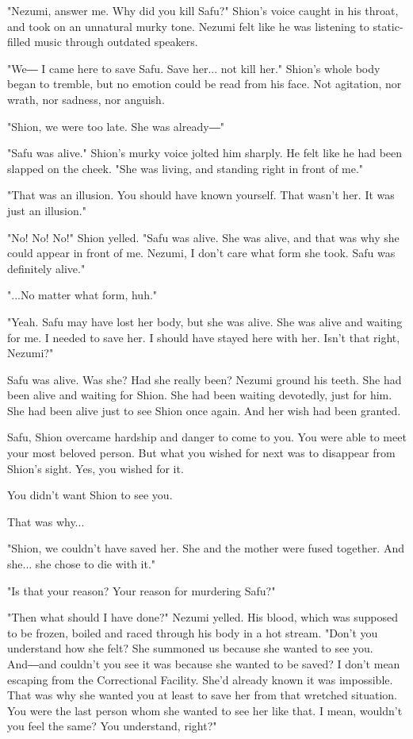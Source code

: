 "Nezumi, answer me. Why did you kill Safu?" Shion's voice caught in his
throat, and took on an unnatural murky tone. Nezumi felt like he was
listening to static-filled music through outdated speakers.

"We― I came here to save Safu. Save her... not kill her." Shion's whole
body began to tremble, but no emotion could be read from his face. Not
agitation, nor wrath, nor sadness, nor anguish.

"Shion, we were too late. She was already―"

"Safu was alive." Shion's murky voice jolted him sharply. He felt like
he had been slapped on the cheek. "She was living, and standing right in
front of me."

"That was an illusion. You should have known yourself. That wasn't her.
It was just an illusion."

"No! No! No!" Shion yelled. "Safu was alive. She was alive, and that was
why she could appear in front of me. Nezumi, I don't care what form she
took. Safu was definitely alive."

"...No matter what form, huh."

"Yeah. Safu may have lost her body, but she was alive. She was alive and
waiting for me. I needed to save her. I should have stayed here with
her. Isn't that right, Nezumi?"

Safu was alive. Was she? Had she really been? Nezumi ground his teeth.
She had been alive and waiting for Shion. She had been waiting
devotedly, just for him. She had been alive just to see Shion once
again. And her wish had been granted.

Safu, Shion overcame hardship and danger to come to you. You were able
to meet your most beloved person. But what you wished for next was to
disappear from Shion's sight. Yes, you wished for it.

You didn't want Shion to see you.

That was why...

"Shion, we couldn't have saved her. She and the mother were fused
together. And she... she chose to die with it."

"Is that your reason? Your reason for murdering Safu?"

"Then what should I have done?" Nezumi yelled. His blood, which was
supposed to be frozen, boiled and raced through his body in a hot
stream. "Don't you understand how she felt? She summoned us because she
wanted to see you. And―and couldn't you see it was because she wanted to
be saved? I don't mean escaping from the Correctional Facility. She'd
already known it was impossible. That was why she wanted you at least to
save her from that wretched situation. You were the last person whom she
wanted to see her like that. I mean, wouldn't you feel the same? You
understand, right?"

